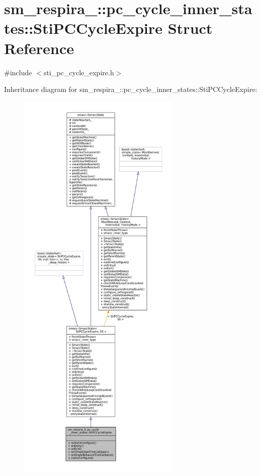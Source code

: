 \hypertarget{structsm__respira__1_1_1pc__cycle__inner__states_1_1StiPCCycleExpire}{}\section{sm\+\_\+respira\+\_\+:\+:pc\+\_\+cycle\+\_\+inner\+\_\+states\+:\+:Sti\+P\+C\+Cycle\+Expire Struct Reference}
\label{structsm__respira__1_1_1pc__cycle__inner__states_1_1StiPCCycleExpire}


{\ttfamily \#include $<$sti\+\_\+pc\+\_\+cycle\+\_\+expire.\+h$>$}



Inheritance diagram for sm\+\_\+respira\+\_\+:\+:pc\+\_\+cycle\+\_\+inner\+\_\+states\+:\+:Sti\+P\+C\+Cycle\+Expire\+:
\nopagebreak
\begin{figure}[H]
\begin{center}
\leavevmode
\includegraphics[height=550pt]{structsm__respira__1_1_1pc__cycle__inner__states_1_1StiPCCycleExpire__inherit__graph}
\end{center}
\end{figure}


